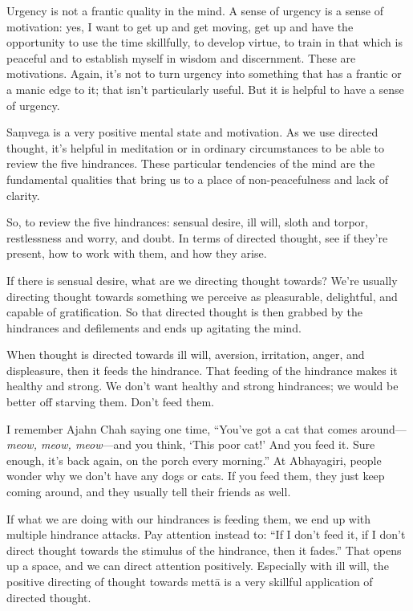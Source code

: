 Urgency is not a frantic quality in the mind. A sense of urgency is a
sense of motivation: yes, I want to get up and get moving, get up and
have the opportunity to use the time skillfully, to develop virtue, to
train in that which is peaceful and to establish myself in wisdom and
discernment. These are motivations. Again, it’s not to turn urgency into
something that has a frantic or a manic edge to it; that isn’t
particularly useful. But it is helpful to have a sense of urgency.

Saṃvega is a very positive mental state and motivation. As we use
directed thought, it’s helpful in meditation or in ordinary
circumstances to be able to review the five hindrances. These particular
tendencies of the mind are the fundamental qualities that bring us to a
place of non-peacefulness and lack of clarity.

So, to review the five hindrances: sensual desire, ill will, sloth and
torpor, restlessness and worry, and doubt. In terms of directed thought,
see if they’re present, how to work with them, and how they arise.

If there is sensual desire, what are we directing thought towards? We’re
usually directing thought towards something we perceive as pleasurable,
delightful, and capable of gratification. So that directed thought is
then grabbed by the hindrances and defilements and ends up agitating the
mind.

When thought is directed towards ill will, aversion, irritation, anger,
and displeasure, then it feeds the hindrance. That feeding of the
hindrance makes it healthy and strong. We don’t want healthy and strong
hindrances; we would be better off starving them. Don’t feed them.

I remember Ajahn Chah saying one time, “You’ve got a cat that comes
around—\emph{meow, meow, meow}—and you think, ‘This poor cat!’ And you
feed it. Sure enough, it’s back again, on the porch every morning.” At
Abhayagiri, people wonder why we don’t have any dogs or cats. If you
feed them, they just keep coming around, and they usually tell their
friends as well.

If what we are doing with our hindrances is feeding them, we end up with
multiple hindrance attacks. Pay attention instead to: “If I don’t feed
it, if I don’t direct thought towards the stimulus of the hindrance,
then it fades.” That opens up a space, and we can direct attention
positively. Especially with ill will, the positive directing of thought
towards mettā is a very skillful application of directed thought.

